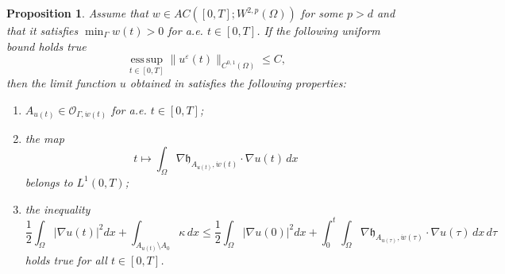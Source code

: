 \documentclass[a4paper,11pt,reqno]{amsart}
\numberwithin{equation}{section}
\newtheorem{prop}[teo]{Proposition}
\theoremstyle{definition}
\theoremstyle{remark}
\begin{document}
\begin{prop} \label{p:cond1}
    Assume that $w\in AC([0,T];W^{2,p}(\Omega))$ for some $p>d$ and that it satisfies $\min_\Gamma w(t)>0$ for a.e. $t\in [0,T]$. If the following uniform bound holds true
    \begin{equation}\label{eq:Lipbounds}
        \operatorname{ess\, sup}\limits_{t\in [0,T]}\|u^\varepsilon(t)\|_{C^{0,1}(\Omega)}\le C,
    \end{equation}
    then the limit function $u$ obtained in  satisfies the following properties:
    \begin{enumerate}[label = (\roman*)]
        \item $A_{u(t)}\in \mathcal O_{\Gamma,\dot w(t)}$ for a.e. $t\in [0,T]$;
        \item the map
            \begin{equation}
                \displaystyle t\mapsto \int_\Omega \nabla \mathfrak{h}_{A_{u(t)},\dot w(t)}\cdot \nabla u(t) \, dx
            \end{equation}
            belongs to $L^1(0,T)$;
        \item the inequality
            \begin{equation}\label{eq:eineqbart}
                \frac 12 \int_\Omega |\nabla u(t)|^2 dx+\int_{A_{u(t)}\setminus A_0}\kappa\,d x\le   \frac 12 \int_\Omega |\nabla u(0)|^2 dx+\int_0^t\int_\Omega \nabla \mathfrak{h}_{A_{u(\tau)},\dot w(\tau)} \cdot \nabla u(\tau) \, dx\, d\tau
            \end{equation}
        holds true for all $t\in [0,T]$.
    \end{enumerate}
\end{prop}
\end{document}
